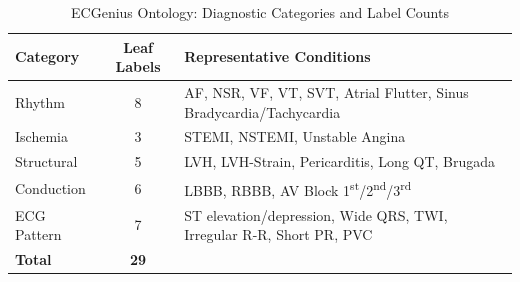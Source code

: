 \documentclass[journal]{IEEEtran}
\begin{document}
\begin{table}[!t]
\centering
\caption{ECGenius Ontology: Diagnostic Categories and Label Counts}
\label{tab:categories}
\begin{tabular}{@{}lcp{4.5cm}@{}}
  \toprule
  Category    & Leaf Labels & Representative Conditions \\
  \midrule
  Rhythm      & 8  & AF, NSR, VF, VT, SVT, Atrial Flutter,
                     Sinus Bradycardia/Tachycardia \\
  Ischemia    & 3  & STEMI, NSTEMI, Unstable Angina \\
  Structural  & 5  & LVH, LVH-Strain, Pericarditis, Long QT,
                     Brugada \\
  Conduction  & 6  & LBBB, RBBB, AV Block 1\textsuperscript{st}/2\textsuperscript{nd}/3\textsuperscript{rd} \\
  ECG Pattern & 7  & ST elevation/depression, Wide QRS, TWI,
                     Irregular R-R, Short PR, PVC \\
  \midrule
  \textbf{Total} & \textbf{29} & \\
  \bottomrule
\end{tabular}
\end{table}
\end{document}
